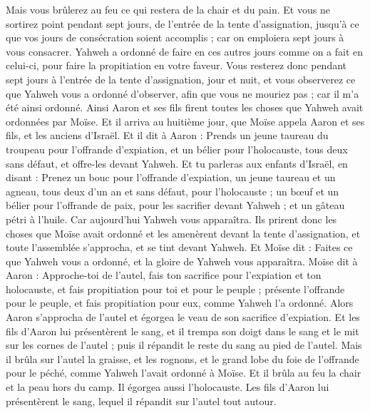 \begin{multicols}{2}
Mais vous brûlerez au feu ce qui restera de la chair et du pain.
Et vous ne sortirez point pendant sept jours, de l'entrée de la tente d'assignation, jusqu'à ce que vos jours de consécration soient accomplis ; car on emploiera sept jours à vous consacrer.
Yahweh a ordonné de faire en ces autres jours comme on a fait en celui-ci, pour faire la propitiation en votre faveur.
Vous resterez donc pendant sept jours à l'entrée de la tente d'assignation, jour et nuit, et vous observerez ce que Yahweh vous a ordonné d'observer, afin que vous ne mouriez pas ; car il m'a été ainsi ordonné.
Ainsi Aaron et ses fils firent toutes les choses que Yahweh avait ordonnées par Moïse.
\VerseOne{}Et il arriva au huitième jour, que Moïse appela Aaron et ses fils, et les anciens d'Israël.
Et il dit à Aaron : Prends un jeune taureau du troupeau pour l'offrande d'expiation, et un bélier pour l'holocauste, tous deux sans défaut, et offre-les devant Yahweh.
Et tu parleras aux enfants d'Israël, en disant : Prenez un bouc pour l'offrande d'expiation, un jeune taureau et un agneau, tous deux d'un an et sans défaut, pour l'holocauste ;
un bœuf et un bélier pour l'offrande de paix, pour les sacrifier devant Yahweh ; et un gâteau pétri à l'huile. Car aujourd'hui Yahweh vous apparaîtra.
Ils prirent donc les choses que Moïse avait ordonné et les amenèrent devant la tente d'assignation, et toute l'assemblée s'approcha, et se tint devant Yahweh.
Et Moïse dit : Faites ce que Yahweh vous a ordonné, et la gloire de Yahweh vous apparaîtra.
Moïse dit à Aaron : Approche-toi de l'autel, fais ton sacrifice pour l'expiation et ton holocauste, et fais propitiation pour toi et pour le peuple ; présente l'offrande pour le peuple, et fais propitiation pour eux, comme Yahweh l'a ordonné.
Alors Aaron s'approcha de l'autel et égorgea le veau de son sacrifice d'expiation.
Et les fils d'Aaron lui présentèrent le sang, et il trempa son doigt dans le sang et le mit sur les cornes de l'autel ; puis il répandit le reste du sang au pied de l'autel.
Mais il brûla sur l'autel la graisse, et les rognons, et le grand lobe du foie de l'offrande pour le péché, comme Yahweh l'avait ordonné à Moïse.
Et il brûla au feu la chair et la peau hors du camp.
Il égorgea aussi l'holocauste. Les fils d'Aaron lui présentèrent le sang, lequel il répandit sur l'autel tout autour.

\end{multicols}

